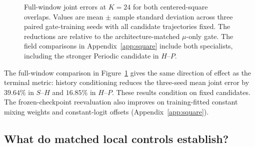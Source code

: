 \documentclass{article}
\begin{document}
\begin{figure}[H]
\centering

\caption{Full-window joint errors at $K=24$ for both centered-square
overlaps. Values are mean $\pm$ sample standard deviation across three
paired gate-training seeds with all candidate trajectories fixed.
The reductions are relative to the architecture-matched $\mu$-only gate.
The field comparisons in Appendix~\ref{app:square} include both
specialists, including the stronger Periodic candidate in $H$--$P$.}
\label{fig:square_overlap}
\end{figure}

The full-window comparison in Figure~\ref{fig:square_overlap} gives the
same direction of effect as the terminal metric: history conditioning
reduces the three-seed mean joint error by $39.64\%$ in $S$--$H$ and
$16.85\%$ in $H$--$P$. These results condition on fixed candidates.
The frozen-checkpoint reevaluation also improves on training-fitted
constant mixing weights and constant-logit offsets
(Appendix~\ref{app:square}).

\subsection{What do matched local controls establish?}
\end{document}
